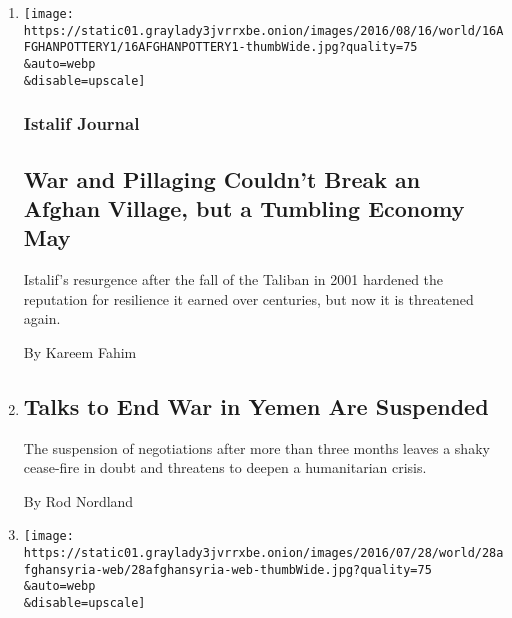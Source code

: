 \begin{enumerate}
\def\labelenumi{\arabic{enumi}.}
\item
  \href{/2016/08/19/world/asia/afghanistan-istalif-pottery.html}{}

  \texttt{[image: https://static01.graylady3jvrrxbe.onion/images/2016/08/16/world/16AFGHANPOTTERY1/16AFGHANPOTTERY1-thumbWide.jpg?quality=75\\\&auto=webp\\\&disable=upscale]}

  \hypertarget{istalif-journal}{%
  \subsubsection{Istalif Journal}\label{istalif-journal}}

  \hypertarget{war-and-pillaging-couldnt-break-an-afghan-village-but-a-tumbling-economy-may}{%
  \subsection{War and Pillaging Couldn't Break an Afghan Village, but a
  Tumbling Economy
  May}\label{war-and-pillaging-couldnt-break-an-afghan-village-but-a-tumbling-economy-may}}

  Istalif's resurgence after the fall of the Taliban in 2001 hardened
  the reputation for resilience it earned over centuries, but now it is
  threatened again.

  By Kareem Fahim
\item
  \href{/2016/08/07/world/middleeast/yemen-peace-talks-cease-fire.html}{}

  \hypertarget{talks-to-end-war-in-yemen-are-suspended}{%
  \subsection{Talks to End War in Yemen Are
  Suspended}\label{talks-to-end-war-in-yemen-are-suspended}}

  The suspension of negotiations after more than three months leaves a
  shaky cease-fire in doubt and threatens to deepen a humanitarian
  crisis.

  By Rod Nordland
\item
  \href{/2016/07/28/world/asia/afghanistan-syria-army-war.html}{}

  \texttt{[image: https://static01.graylady3jvrrxbe.onion/images/2016/07/28/world/28afghansyria-web/28afghansyria-web-thumbWide.jpg?quality=75\\\&auto=webp\\\&disable=upscale]}

  \hypertarget{afghans-go-to-syria-to-fight-for-its-government-and-anguish-results}{%
}
\end{enumerate}
